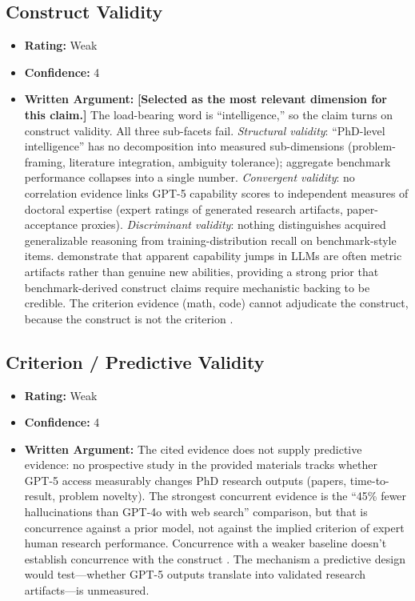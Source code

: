 \subsection{Construct Validity}
\begin{itemize}
    \item \textbf{Rating:} Weak
    \item \textbf{Confidence:} 4
    \item \textbf{Written Argument:} \textbf{[Selected as the most relevant dimension for this claim.]} The load-bearing word is ``intelligence,'' so the claim turns on construct validity. All three sub-facets fail. \emph{Structural validity}: ``PhD-level intelligence'' has no decomposition into measured sub-dimensions (problem-framing, literature integration, ambiguity tolerance); aggregate benchmark performance collapses into a single number. \emph{Convergent validity}: no correlation evidence links GPT-5 capability scores to independent measures of doctoral expertise (expert ratings of generated research artifacts, paper-acceptance proxies). \emph{Discriminant validity}: nothing distinguishes acquired generalizable reasoning from training-distribution recall on benchmark-style items. \citet{schaeffer2023emergent} demonstrate that apparent capability jumps in LLMs are often metric artifacts rather than genuine new abilities, providing a strong prior that benchmark-derived construct claims require mechanistic backing to be credible. The criterion evidence (math, code) cannot adjudicate the construct, because the construct is not the criterion \citep{salaudeen2025measurement}.
\end{itemize}

\subsection{Criterion / Predictive Validity}
\begin{itemize}
    \item \textbf{Rating:} Weak
    \item \textbf{Confidence:} 4
    \item \textbf{Written Argument:} The cited evidence does not supply predictive evidence: no prospective study in the provided materials tracks whether GPT-5 access measurably changes PhD research outputs (papers, time-to-result, problem novelty). The strongest concurrent evidence is the ``45\% fewer hallucinations than GPT-4o with web search'' comparison, but that is concurrence against a prior model, not against the implied criterion of expert human research performance. Concurrence with a weaker baseline doesn't establish concurrence with the construct \citep{salaudeen2025measurement}. The mechanism a predictive design would test---whether GPT-5 outputs translate into validated research artifacts---is unmeasured.
\end{itemize}

